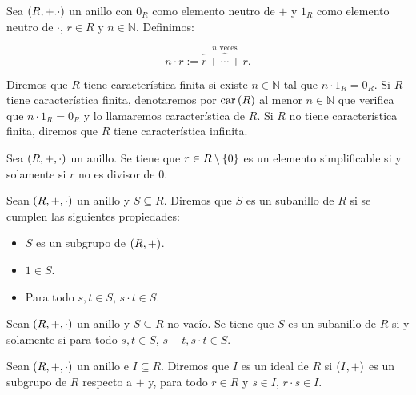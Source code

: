 \begin{definition}
  \rm Sea $\left(R,+.\cdot\right)$ un anillo con $0_R$ como elemento neutro de $+$ y $1_R$ como elemento neutro de $\cdot$, $r\in R$ y $n\in\mathbb{N}$. Definimos:

  \begin{equation}
    n\cdot r:=\overbrace{r+\cdots+r}^{n\text{ veces}}.
  \end{equation}

  Diremos que $R$ tiene característica finita si existe $n\in\mathbb{N}$ tal que $n\cdot 1_R=0_R$. Si $R$ tiene característica finita, denotaremos por $\text{car}\left(R\right)$ al menor $n\in\mathbb{N}$ que verifica que $n\cdot 1_R=0_R$ y lo llamaremos característica de $R$. Si $R$ no tiene característica finita, diremos que $R$ tiene característica infinita.
\end{definition}

\begin{proposition}
  \rm Sea $\left(R,+,\cdot\right)$ un anillo. Se tiene que $r\in R\setminus\left\{0\right\}$ es un elemento simplificable si y solamente si $r$ no es divisor de $0$.
\end{proposition}

\begin{definition}
  \rm Sean $\left(R,+,\cdot\right)$ un anillo y $S\subseteq R$. Diremos que $S$ es un subanillo de $R$ si se cumplen las siguientes propiedades:
  
  \begin{itemize}
    \item[1.] $S$ es un subgrupo de $\left(R,+\right)$.
    \item[2.] $1\in S$.
    \item[3.] Para todo $s,t\in S$, $s\cdot t\in S$.
  \end{itemize} 
\end{definition}

\begin{theorem}
  \rm Sean $\left(R,+,\cdot\right)$ un anillo y $S\subseteq R$ no vacío. Se tiene que $S$ es un subanillo de $R$ si y solamente si para todo $s,t\in S$, $s-t,s\cdot t\in S$.
\end{theorem}

\begin{definition}
  \rm Sean $\left(R,+,\cdot\right)$ un anillo e $I\subseteq R$. Diremos que $I$ es un ideal de $R$ si $\left(I,+\right)$ es un subgrupo de $R$ respecto a $+$ y, para todo $r\in R$ y $s\in I$, $r\cdot s\in I$.
\end{definition}

